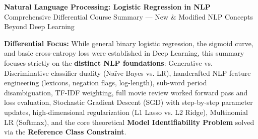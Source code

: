 \documentclass[10pt,a4paper]{article}
\begin{document}
\begin{center}
    \vspace{-4pt}
    {\LARGE\bfseries\color{themeblue} Natural Language Processing: Logistic Regression in NLP}\\[1pt]
    {\small\color{darkgray} Comprehensive Differential Course Summary --- New \& Modified NLP Concepts Beyond Deep Learning}
    \vspace{-3pt}
\end{center}

\begin{overviewbox}
\textbf{Differential Focus:} While general binary logistic regression, the sigmoid curve, and basic cross-entropy loss were established in Deep Learning, this summary focuses strictly on the \textbf{distinct NLP foundations}: Generative vs. Discriminative classifier duality (Naïve Bayes vs. LR), handcrafted NLP feature engineering (lexicons, negation flags, log-length), sub-word period disambiguation, TF-IDF weighting, full movie review worked forward pass and loss evaluation, Stochastic Gradient Descent (SGD) with step-by-step parameter updates, high-dimensional regularization (L1 Lasso vs. L2 Ridge), Multinomial LR (Softmax), and the core theoretical \textbf{Model Identifiability Problem} solved via the \textbf{Reference Class Constraint}.
\end{overviewbox}
\vspace{2pt}
\end{document}
